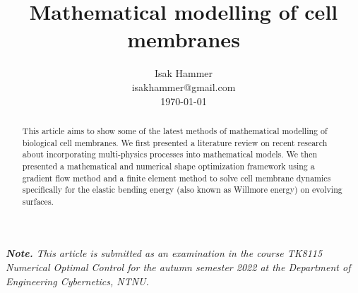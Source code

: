 \documentclass[10pt,conference]{IEEEtran}
\title{ {\Large \textbf{Mathematical modelling of cell membranes }} }
\begin{document}
\author{
Isak Hammer \\
\small{isakhammer@gmail.com \\ \today}

}

\maketitle
\begin{sloppy}
\textit{ \textbf{Note.} This article is submitted as an examination in the course TK8115 Numerical Optimal Control for the autumn semester 2022 at the Department of Engineering Cybernetics, NTNU. \\}


\begin{abstract}
This article aims to show some of the latest methods of mathematical modelling of biological cell membranes. We first presented a literature review on recent research about incorporating multi-physics processes into mathematical models. We then presented a
mathematical and numerical shape optimization framework using a gradient flow method and
a finite element method to solve cell membrane dynamics specifically for the elastic bending energy (also known as Willmore energy) on evolving surfaces.
\end{abstract}

    
    
    
    
    

    \printbibliography
\end{sloppy}
\end{document}
